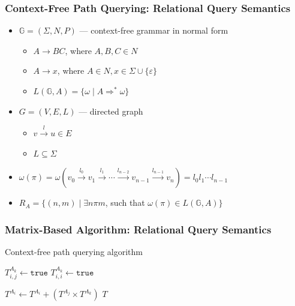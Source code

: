 \documentclass[xcolor=table]{beamer}
\begin{document}
  \begin{frame}[fragile]
    \frametitle{Context-Free Path Querying: Relational Query Semantics}
    \begin{itemize}
      \item $\mathbb{G} = (\Sigma, N, P)$ --- context-free grammar in normal form
      \begin{itemize}
        \item $A \rightarrow B C$, where $A, B, C \in N$
        \item $A \rightarrow x$, where $A \in N, x \in \Sigma \cup \{\varepsilon\}$
        \item $L(\mathbb{G},A) = \{ \omega \mid A \Rightarrow^* \omega \}$
      \end{itemize}
      \pause
      \item $G = (V,E,L)$ --- directed graph
        \begin{itemize}
          \item $v \xrightarrow{l} u \in E$
          \item $L \subseteq \Sigma$
        \end{itemize}
        \pause
      \item $\omega(\pi) = \omega(v_0 \xrightarrow{l_0} v_1 \xrightarrow{l_1} \cdots \xrightarrow{l_{n-2}} v_{n-1} \xrightarrow{l_{n-1}} v_n) = l_0 l_1 \cdots l_{n-1}$
      \pause
      \item $R_A = \{ (n, m) \mid \exists n \pi m$, such that $\omega(\pi) \in L(\mathbb{G},A)\}$
    \end{itemize}
  \end{frame}

  \begin{frame}[fragile] \frametitle{Matrix-Based Algorithm: Relational Query Semantics}
    	\begin{algorithm}[H]
    		\begin{algorithmic}[1]
    			\caption{Context-free path querying algorithm}
    			\label{lst:algo1}
    			{$T^{A_k}_{i,j} \gets \texttt{true}$}
    			\EndFor
    			{$T^{A_k}_{i,i} \gets \texttt{true}$}
    			\EndFor
    			\EndFor
    			
    			{ $T^{A_i} \gets T^{A_i} + (T^{A_j} \times T^{A_k})$ } 
    			\EndFor
    			\EndWhile
    			\State \Return $T$
    			\EndFunction
    		\end{algorithmic}
    	\end{algorithm}
  \end{frame}
\end{document}
